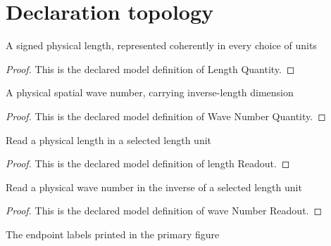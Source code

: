 \section{Declaration topology}
\begin{definition}
  \label{def:physics:phyx-mini-0208:phyxminiproblems-problemphyxmini0208-lengthquantity}
  A signed physical length, represented coherently in every choice of units
\end{definition}
\begin{proof}
  This is the declared model definition of Length Quantity.
\end{proof}
\begin{definition}
  \label{def:physics:phyx-mini-0208:phyxminiproblems-problemphyxmini0208-wavenumberquantity}
  A physical spatial wave number, carrying inverse-length dimension
\end{definition}
\begin{proof}
  This is the declared model definition of Wave Number Quantity.
\end{proof}
\begin{definition}
  \label{def:physics:phyx-mini-0208:phyxminiproblems-problemphyxmini0208-lengthreadout}
  Read a physical length in a selected length unit
\end{definition}
\begin{proof}
  This is the declared model definition of length Readout.
\end{proof}
\begin{definition}
  \label{def:physics:phyx-mini-0208:phyxminiproblems-problemphyxmini0208-wavenumberreadout}
  Read a physical wave number in the inverse of a selected length unit
\end{definition}
\begin{proof}
  This is the declared model definition of wave Number Readout.
\end{proof}
\begin{definition}
  \label{def:physics:phyx-mini-0208:phyxminiproblems-problemphyxmini0208-stringendpoint}
  The endpoint labels printed in the primary figure
\end{definition}
